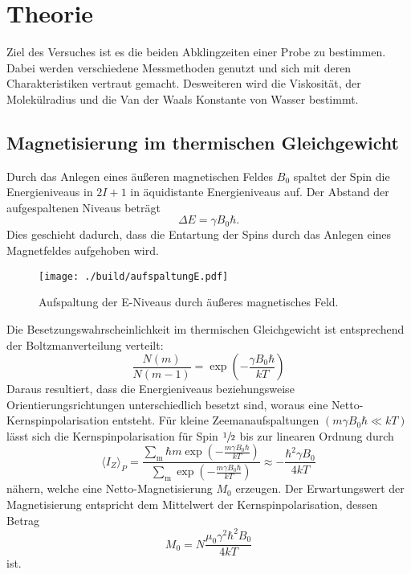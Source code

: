 \section{Theorie}%
\label{sec:theorie}
Ziel des Versuches ist es die beiden Abklingzeiten einer Probe zu bestimmen. 
Dabei werden verschiedene Messmethoden genutzt und sich mit deren
Charakteristiken vertraut gemacht. 
Desweiteren wird die Viskosität, der Molekülradius und die Van der Waals
Konstante von Wasser bestimmt.
\subsection{Magnetisierung im thermischen Gleichgewicht}%
\label{ssub:magnetieserung_im_thermischen_gleichgewicht}
Durch das Anlegen eines äußeren magnetischen Feldes $B_0$ spaltet der Spin die Energieniveaus in $2 I
+ 1$ in äquidistante Energieniveaus auf. 
Der Abstand der aufgespaltenen Niveaus beträgt 
\begin{equation}
		\label{eq:delta_e}
		\Delta E = \gamma B_0 \hbar. 
\end{equation}
Dies geschieht dadurch, dass die Entartung der Spins durch das Anlegen eines
Magnetfeldes aufgehoben wird.
\begin{figure}[ht]
		\centering
		\texttt{[image: ./build/aufspaltungE.pdf]}
		\caption{Aufspaltung der E-Niveaus durch äußeres magnetisches
		Feld. \cite{anleitung}}
		\label{fig:aufsp_E}
\end{figure}
Die Besetzungswahrscheinlichkeit im thermischen Gleichgewicht ist entsprechend
der Boltzmanverteilung verteilt:
\begin{equation}
		\label{eq:boltzmann}
		\frac{N(m)}{N(m-1)} = \exp \left( - \frac{\gamma B_0 \hbar}{kT} \right)
\end{equation}
Daraus resultiert, dass die Energieniveaus beziehungsweise Orientierungsrichtungen unterschiedlich
besetzt sind, woraus eine Netto-Kernspinpolarisation entsteht. 
Für kleine Zeemanaufspaltungen $(m \gamma B_0 \hbar \ll kT)$ lässt sich die
Kernspinpolarisation für Spin $\sfrac{1}{2}$ bis zur
linearen Ordnung durch
\begin{equation}
		\label{eq:kernpo}
		\langle I_Z \rangle_P = \frac{\sum_\text{m} \hbar m \exp\left(-\frac{m \gamma B_0
		\hbar}{kT}\right)}{\sum_\text{m}\exp\left(-\frac{m \gamma B_0
		\hbar}{kT}\right)} \approx - \frac{\hbar^2 \gamma B_0}{4 kT}
\end{equation}
nähern, welche eine Netto-Magnetisierung $M_0$ erzeugen. 
Der Erwartungswert der Magnetisierung entspricht dem Mittelwert der
Kernspinpolarisation, dessen Betrag 
\begin{equation}
		\label{eq:magn}
		M_0 = N \frac{\mu_0 \gamma^2 \hbar^2 B_0}{4 kT} 
\end{equation}
ist.

